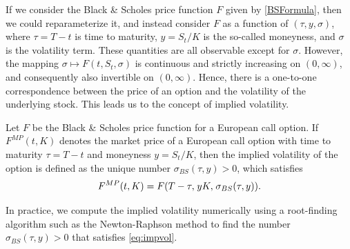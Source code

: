 If we consider the Black \& Scholes price function $F$ given by \eqref{BSFormula}, then we could reparameterize it, and instead consider $F$ as a function of $(\tau, y, \sigma)$, where $\tau=T-t$ is time to maturity, $y=S_{t}/K$ is the so-called moneyness, and $\sigma$ is the volatility term. These quantities are all observable except for $\sigma$. However, the mapping $\sigma\mapsto F(t,S_{t},\sigma)$ is continuous and strictly increasing on $(0,\infty)$, and consequently also invertible on $(0,\infty)$. Hence, there is a one-to-one correspondence between the price of an option and the volatility of the underlying stock. This leads us to the concept of implied volatility.
\begin{defn}
    Let $F$ be the Black \& Scholes price function for a European call option. If $F^{MP}(t, K)$ denotes the market price of a European call option with time to maturity $\tau=T-t$ and moneyness $y=S_{t}/K$, then the implied volatility of the option is defined as the unique number $\sigma_{BS}(\tau, y)>0$, which satisfies
    \begin{equation}\label{eq:impvol}
        F^{MP}(t,K)=F\left(T-\tau, \hspace{1 pt}yK,\hspace{1 pt}\sigma_{BS}(\tau,y)\right).
    \end{equation}
\end{defn}
In practice, we compute the implied volatility numerically using a root-finding algorithm such as the Newton-Raphson method to find the number $\sigma_{BS}(\tau,y)>0$ that satisfies \eqref{eq:impvol}. 

